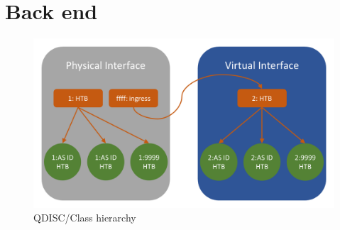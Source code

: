 \section{Back end}

\begin{figure}[h]
	\centering
	\includegraphics[width=\textwidth]{img/QDISC-Set-up.png}
	\caption{QDISC/Class hierarchy}
	\label{QDISC-Set-up}
\end{figure}